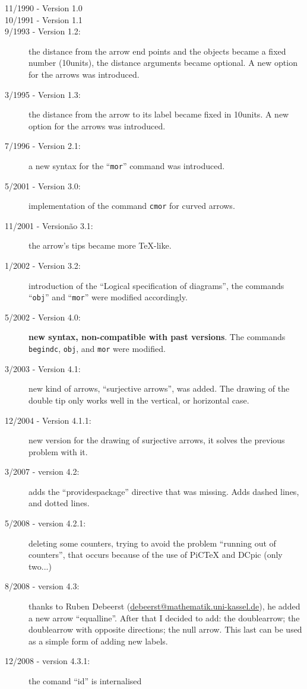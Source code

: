 \documentclass[11pt]{article}
\begin{document}
\begin{description}
\item[11/1990 - Version 1.0]
\item[10/1991 - Version 1.1]
\item[9/1993  - Version 1.2:] the distance from the arrow end
  points and the objects became a fixed number (10units), the distance
  arguments became optional.  A new option for the arrows was introduced.
\item[3/1995  - Version 1.3:] the distance from the arrow to its
  label became fixed in 10units. A new option for the arrows was introduced.
\item[7/1996  - Version 2.1:] a new syntax for the ``{\tt mor}''
  command was introduced. 
\item[5/2001 - Version 3.0:] implementation of the command {\tt cmor}
  for curved arrows.
\item[11/2001 - Version{\~a}o 3.1:] the arrow's tips became more \TeX-like.
\item[1/2002  - Version 3.2:] introduction of the ``Logical
  specification of diagrams'', the commands ``{\tt obj}'' and
  ``{\tt mor}'' were modified accordingly.
\item[5/2002 - Version 4.0:] {\bf new syntax, non-compatible with past
    versions}. The commands  {\tt begindc},  {\tt obj}, and {\tt mor}
  were modified.
\item[3/2003 - Version 4.1:] new kind of arrows, ``surjective
  arrows'', was added. The drawing of the double tip only works well
  in the vertical, or horizontal case.
\item[12/2004 - Version 4.1.1:] new version for the drawing of
  surjective arrows, it solves the previous problem with it.
\item[3/2007 - version 4.2:] adds the ``providespackage'' directive
  that was missing.  Adds dashed lines, and dotted lines.
\item[5/2008 - version 4.2.1:] deleting some counters, trying to
  avoid the problem ``running out of counters'', that occurs because of
  the use of PiCTeX and DCpic (only two...)
\item[8/2008 - version 4.3:] thanks to Ruben Debeerst
  (\url{debeerst@mathematik.uni-kassel.de}), he added a new arrow
  ``equalline''. After that I decided to add: the doublearrow; the
  doublearrow with opposite directions; the null arrow. This last can
  be used as a simple form of adding new labels.
\item[12/2008 - version 4.3.1:] the comand ``id'' is internalised

\end{description}
\end{document}
